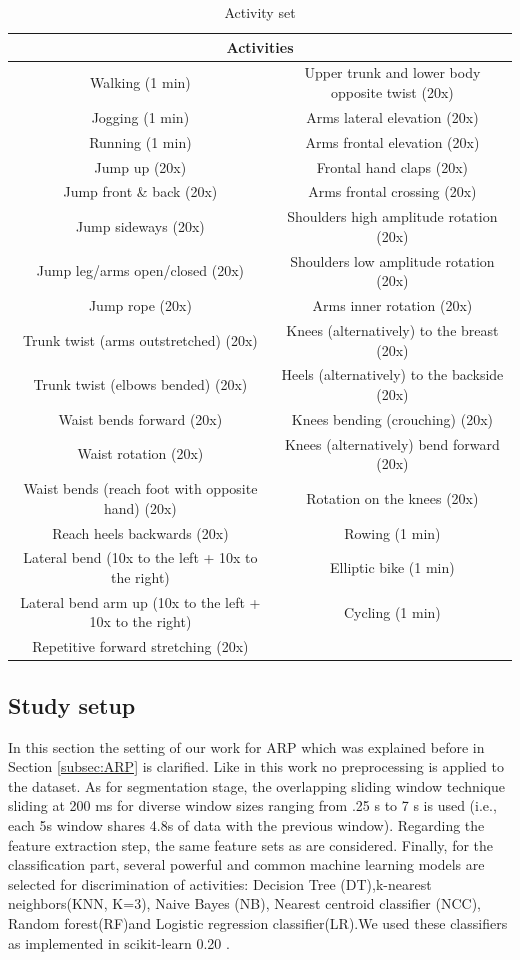\begin{table}[h!]
\tiny  
  \centering
\begin{tabular}{|c|c|}
\hline 
\multicolumn{2}{|c|}{Activities}\tabularnewline
\hline 
\hline 
Walking (1 min) & Upper trunk and lower body opposite twist (20x)\tabularnewline
\hline 
Jogging (1 min) & Arms lateral elevation (20x)\tabularnewline
\hline 
Running (1 min) & Arms frontal elevation (20x)\tabularnewline
\hline 
Jump up (20x) & Frontal hand claps (20x)\tabularnewline
\hline 
Jump front \& back (20x) & Arms frontal crossing (20x)\tabularnewline
\hline 
Jump sideways (20x) & Shoulders high amplitude rotation (20x)\tabularnewline
\hline 
Jump leg/arms open/closed (20x) & Shoulders low amplitude rotation (20x)\tabularnewline
\hline 
Jump rope (20x) & Arms inner rotation (20x)\tabularnewline
\hline 
Trunk twist (arms outstretched) (20x) & Knees (alternatively) to the breast (20x)\tabularnewline
\hline 
Trunk twist (elbows bended) (20x) & Heels (alternatively) to the backside (20x)\tabularnewline
\hline 
Waist bends forward (20x) & Knees bending (crouching) (20x)\tabularnewline
\hline 
Waist rotation (20x) & Knees (alternatively) bend forward (20x)\tabularnewline
\hline 
Waist bends (reach foot with opposite hand) (20x) & Rotation on the knees (20x)\tabularnewline
\hline 
Reach heels backwards (20x) & Rowing (1 min)\tabularnewline
\hline 
Lateral bend (10x to the left + 10x to the right) & Elliptic bike (1 min)\tabularnewline
\hline 
Lateral bend arm up (10x to the left + 10x to the right) & Cycling (1 min)\tabularnewline
\hline 
Repetitive forward stretching (20x) & \tabularnewline
\hline 
\end{tabular}

        \caption{Activity set }
        \label{tab:Activites}

\end{table} 


\subsection{Study setup}
In this section the setting of our work for ARP which was explained before in Section \ref{subsec:ARP} is clarified. Like \cite{banos2014window} in this work no preprocessing is applied to the dataset. As for segmentation stage, the overlapping sliding window technique sliding at 200 ms for diverse window sizes ranging from .25 s to 7 s is used (i.e., each 5s window shares 4.8s of data with the previous window). Regarding the feature extraction step, the same feature sets as \cite{banos2014window} are considered. Finally, for the classification part, several powerful and common machine learning models are selected for discrimination of activities: Decision Tree (DT),k-nearest neighbors(KNN, K=3), Naive Bayes (NB), Nearest centroid classifier (NCC), Random forest(RF)and Logistic regression classifier(LR).We used these classifiers as implemented in scikit-learn 0.20 \cite{pedregosa2011scikit}.\newline

